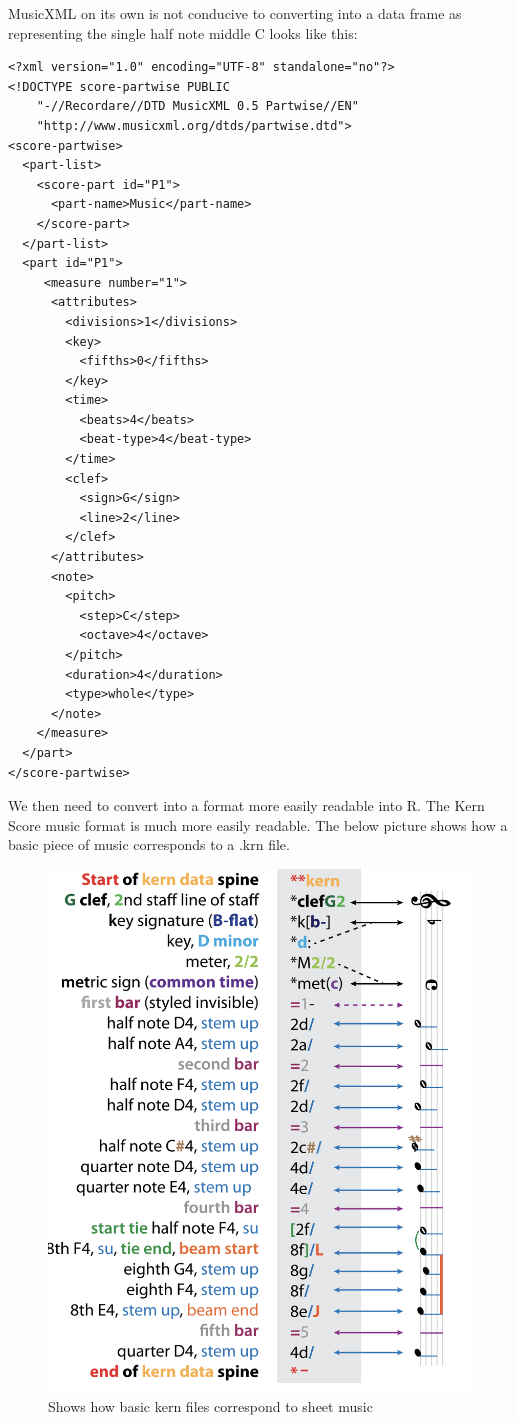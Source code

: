 \documentclass[12pt,twoside]{reedthesis}
\theoremstyle{definition}
\theoremstyle{definition}
\theoremstyle{definition}
\theoremstyle{remark}
\begin{document}
MusicXML on its own is not conducive to converting into a data frame as
representing the single half note middle C looks like this:
\begin{verbatim}
<?xml version="1.0" encoding="UTF-8" standalone="no"?>
<!DOCTYPE score-partwise PUBLIC
    "-//Recordare//DTD MusicXML 0.5 Partwise//EN"
    "http://www.musicxml.org/dtds/partwise.dtd">
<score-partwise>
  <part-list>
    <score-part id="P1">
      <part-name>Music</part-name>
    </score-part>
  </part-list>
  <part id="P1">
     <measure number="1">
      <attributes>
        <divisions>1</divisions>
        <key>
          <fifths>0</fifths>
        </key>
        <time>
          <beats>4</beats>
          <beat-type>4</beat-type>
        </time>
        <clef>
          <sign>G</sign>
          <line>2</line>
        </clef>
      </attributes>
      <note>
        <pitch>
          <step>C</step>
          <octave>4</octave>
        </pitch>
        <duration>4</duration>
        <type>whole</type>
      </note>
    </measure>
  </part>
</score-partwise> 
\end{verbatim}
We then need to convert into a format more easily readable into R. The
Kern Score music format is much more easily readable. The below picture
shows how a basic piece of music corresponds to a .krn file.
\begin{figure}
\centering
\includegraphics{images/krnmusic.png}
\caption{Shows how basic kern files correspond to sheet music}
\end{figure}
\end{document}

